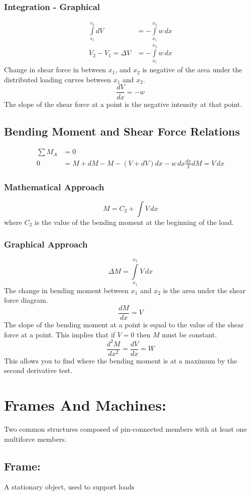 \documentclass[14pt]{article}
\begin{document}
    \subsubsection{Integration - Graphical}
    \begin{align*}
        \int \limits_{v_1}^{v_2}dV&=-\int\limits_{x_1}^{x_2}w\, dx\\
        V_2-V_1=\Delta V&=-\int \limits_{x_1}^{x_2} w\, dx 
    \end{align*}
    Change in shear force in between $x_1$, and $x_2$ is negative of the area under the distributed loading curves between $x_1$ and $x_2$.
    $$\frac{dV}{dx}=-w$$
    The slope of the shear force at a point is the negative intensity at that point.
    \subsection{Bending Moment and Shear Force Relations}
    \begin{align*}
        \sum M_A&=0\\
        0&=M+dM-M-(V+dV)dx-w\, dx\frac{dx}{2}
        dM=V\,dx
    \end{align*}
    \subsubsection{Mathematical Approach}
    $$M=C_2+\int V\, dx$$
    where $C_2$ is the value of the bending moment at the beginning of the load.
    \subsubsection{Graphical Approach}
    $$\Delta M=\int \limits_{x_1}^{x_2}V\, dx$$
    The change in bending moment between $x_1$ and $x_2$ is the area under the shear force diagram.
    $$\frac{dM}{dx}=V$$
    The slope of the bending moment at a point is equal to the value of the shear force at a point.
    This implies that if $V=0$ then $M$ must be constant.
    $$\frac{d^2M}{dx^2}=\frac{dV}{dx}=W$$
    This allows you to find where the bending moment is at a maximum by the second derivative test.
    \section{Frames And Machines: }
    Two common structures composed of pin-connected members with at least one multiforce members.
    \subsection{Frame:}
    A stationary object, used to support loads
\end{document}
